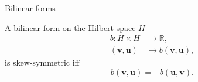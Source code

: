 \begin{theorem}
\end{theorem}

\begin{section}{Bilinear forms}
	
\begin{definition}\label{def:sk_bilinear}
A bilinear form on the Hilbert space $H$
\begin{equation*}
\begin{aligned}
b: H \times H &\longrightarrow \mathbb{R}, \\
(\bm{v}, \bm{u}) &\longrightarrow b(\bm{v}, \bm{u}),
\end{aligned}
\end{equation*}
is skew-symmetric iff
\begin{equation*}
b(\bm{v}, \bm{u}) = - b(\bm{u}, \bm{v}).
\end{equation*}
\end{definition}


\end{section}
